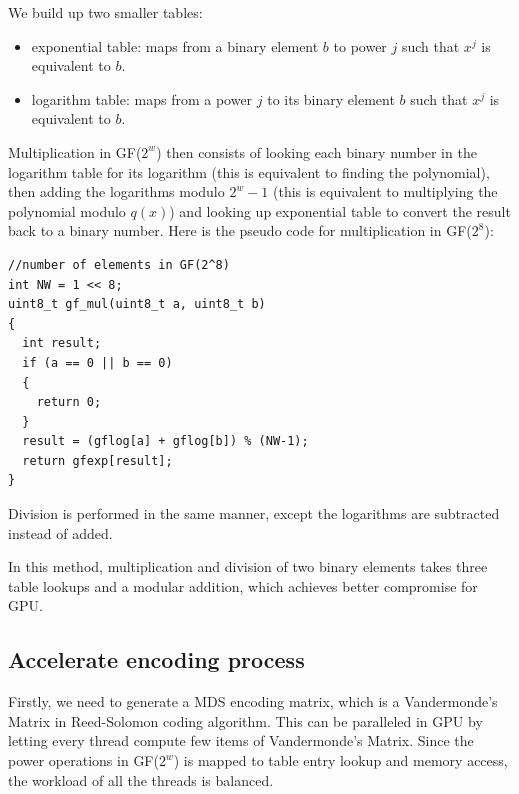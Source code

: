 \documentclass[a4paper]{article}
\begin{document}
%

We build up two smaller tables:
\begin{itemize}
  \item exponential table: maps from a binary element $b$ to power $j$ such that $x^j$ is equivalent to $b$.
  \item logarithm table: maps from a power $j$ to its binary element $b$ such that $x^j$ is equivalent to $b$.
\end{itemize}
Multiplication in GF($2^w$) then consists of 
looking each binary number in the logarithm table for its logarithm (this is equivalent to finding the polynomial), 
then adding the logarithms modulo $2^w-1$ (this is equivalent to multiplying the polynomial modulo $q(x)$) 
and 
looking up exponential table to convert the result back to a binary number.
Here is the pseudo code for multiplication in GF($2^8$):
\begin{verbatim}
//number of elements in GF(2^8)
int NW = 1 << 8;
uint8_t gf_mul(uint8_t a, uint8_t b)
{
  int result;
  if (a == 0 || b == 0)
  {
    return 0;
  }
  result = (gflog[a] + gflog[b]) % (NW-1);
  return gfexp[result];
}
\end{verbatim}
Division is performed in the same manner, except the logarithms are subtracted instead of added.

In this method, multiplication and division of two binary elements takes three table lookups and a modular addition,
which achieves better compromise for GPU.

\subsection{Accelerate encoding process}

Firstly, we need to generate a MDS encoding matrix,
which is a Vandermonde's Matrix in Reed-Solomon coding algorithm.
%
This can be paralleled in GPU by letting every thread compute few items of Vandermonde's Matrix.
Since the power operations in GF($2^w$) is mapped to
table entry lookup and memory access,
the workload of all the threads is balanced.
\end{document}

